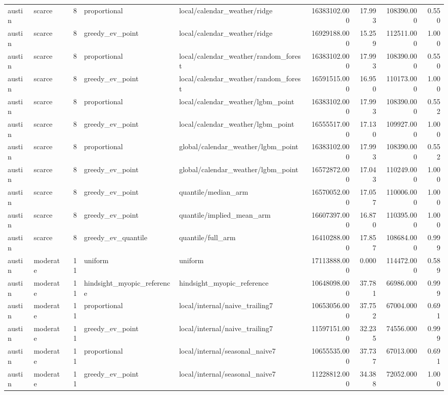\begin{tabular}{llrllrrrr}
austin & scarce & 8 & proportional & local/calendar\_weather/ridge & 16383102.000 & 17.993 & 108390.000 & 0.550 \\
austin & scarce & 8 & greedy\_ev\_point & local/calendar\_weather/ridge & 16929188.000 & 15.259 & 112511.000 & 1.000 \\
austin & scarce & 8 & proportional & local/calendar\_weather/random\_forest & 16383102.000 & 17.993 & 108390.000 & 0.550 \\
austin & scarce & 8 & greedy\_ev\_point & local/calendar\_weather/random\_forest & 16591515.000 & 16.950 & 110173.000 & 1.000 \\
austin & scarce & 8 & proportional & local/calendar\_weather/lgbm\_point & 16383102.000 & 17.993 & 108390.000 & 0.552 \\
austin & scarce & 8 & greedy\_ev\_point & local/calendar\_weather/lgbm\_point & 16555517.000 & 17.130 & 109927.000 & 1.000 \\
austin & scarce & 8 & proportional & global/calendar\_weather/lgbm\_point & 16383102.000 & 17.993 & 108390.000 & 0.552 \\
austin & scarce & 8 & greedy\_ev\_point & global/calendar\_weather/lgbm\_point & 16572872.000 & 17.043 & 110249.000 & 1.000 \\
austin & scarce & 8 & greedy\_ev\_point & quantile/median\_arm & 16570052.000 & 17.057 & 110006.000 & 1.000 \\
austin & scarce & 8 & greedy\_ev\_point & quantile/implied\_mean\_arm & 16607397.000 & 16.870 & 110395.000 & 1.000 \\
austin & scarce & 8 & greedy\_ev\_quantile & quantile/full\_arm & 16410288.000 & 17.857 & 108684.000 & 0.999 \\
austin & moderate & 11 & uniform & uniform & 17113888.000 & 0.000 & 114472.000 & 0.589 \\
austin & moderate & 11 & hindsight\_myopic\_reference & hindsight\_myopic\_reference & 10648098.000 & 37.781 & 66986.000 & 0.999 \\
austin & moderate & 11 & proportional & local/internal/naive\_trailing7 & 10653056.000 & 37.752 & 67004.000 & 0.691 \\
austin & moderate & 11 & greedy\_ev\_point & local/internal/naive\_trailing7 & 11597151.000 & 32.235 & 74556.000 & 0.999 \\
austin & moderate & 11 & proportional & local/internal/seasonal\_naive7 & 10655535.000 & 37.737 & 67013.000 & 0.691 \\
austin & moderate & 11 & greedy\_ev\_point & local/internal/seasonal\_naive7 & 11228812.000 & 34.388 & 72052.000 & 1.000 \\

\end{tabular}
